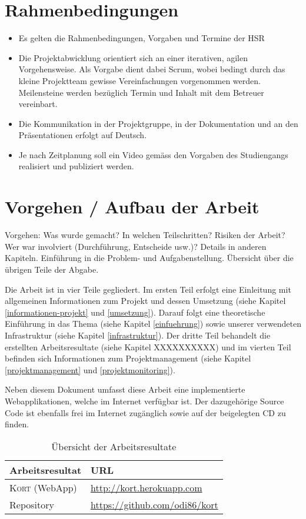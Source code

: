 \section{Rahmenbedingungen}
\begin{itemize}
\item Es gelten die Rahmenbedingungen, Vorgaben und Termine der HSR
\item Die Projektabwicklung orientiert sich an einer iterativen, agilen Vorgehensweise. Als Vorgabe dient dabei Scrum, wobei bedingt durch das kleine Projektteam gewisse Vereinfachungen vorgenommen werden. Meilensteine werden bezüglich Termin und Inhalt mit dem Betreuer vereinbart.
\item Die Kommunikation in der Projektgruppe, in der Dokumentation und an den Präsentationen erfolgt auf Deutsch.
\item Je nach Zeitplanung soll ein Video gemäss den Vorgaben des Studiengangs realisiert und publiziert werden.
\end{itemize}

\section{Vorgehen / Aufbau der Arbeit}
Vorgehen: Was wurde gemacht? In welchen Teilschritten? Risiken der Arbeit? Wer war involviert (Durchführung, Entscheide usw.)? Details in anderen Kapiteln.
Einführung in die Problem- und Aufgabenstellung. Übersicht über die übrigen Teile der Abgabe. 


Die Arbeit ist in vier Teile gegliedert. Im ersten Teil erfolgt eine Einleitung mit allgemeinen Informationen zum Projekt und dessen Umsetzung (siehe Kapitel \ref{informationen-projekt} und \ref{umsetzung}). Darauf folgt eine theoretische Einführung in das Thema (siehe Kapitel \ref{einfuehrung}) sowie unserer verwendeten Infrastruktur (siehe Kapitel \ref{infrastruktur}). Der dritte Teil behandelt die erstellten Arbeitsresultate (siehe Kapitel XXXXXXXXXX) und im vierten Teil befinden sich Informationen zum Projektmanagement (siehe Kapitel \ref{projektmanagement} und \ref{projektmonitoring}).

Neben diesem Dokument umfasst diese Arbeit eine implementierte Webapplikationen, welche im Internet verfügbar ist. Der dazugehörige Source Code ist ebenfalls frei im Internet zugänglich sowie auf der beigelegten CD zu finden.

\begin{table}[H]
\centering
\begin{tabular}{|p{0.3\twocelltabwidth}|p{0.7\twocelltabwidth}|}
\hline 
\textbf{Arbeitsresultat} & \textbf{URL} \\ 
\hline 
\textsc{Kort} (WebApp) & \url{http://kort.herokuapp.com} \\ 
\hline 
Repository & \url{https://github.com/odi86/kort} \\ 
\hline 
\end{tabular}
\label{arbeitsresultate}
\caption{Übersicht der Arbeitsresultate}
\end{table} 
